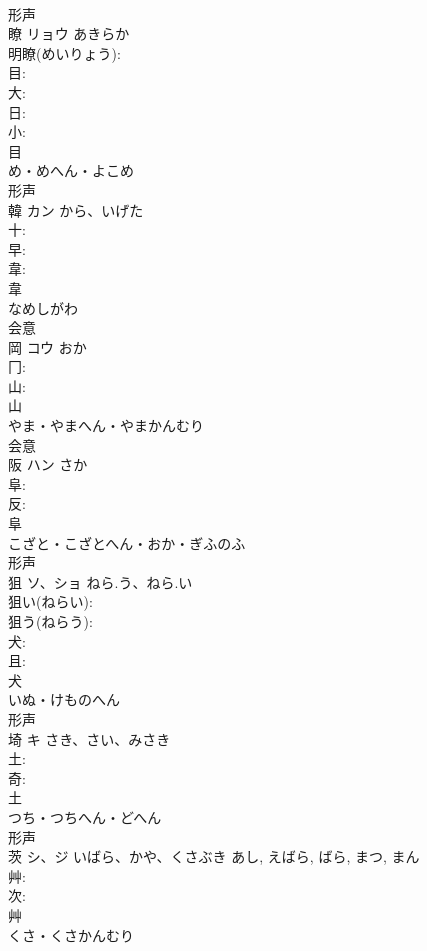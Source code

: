 \documentclass[8pt]{extreport}
\begin{document}
\begin{CJK}{UTF8}{min}
\\	形声 
\\	瞭	リョウ	あきらか		
\\	明瞭(めいりょう): 
\\	目: 
\\	大: 
\\	日: 
\\	小: 
\\	目	
\\	め・めへん・よこめ	
\\	形声 
\\	韓	カン	から、いげた		
\\	十: 
\\	早: 
\\	韋: 
\\	韋	
\\	なめしがわ	
\\	会意 
\\	岡	コウ	おか		
\\	冂: 
\\	山: 
\\	山	
\\	やま・やまへん・やまかんむり	
\\	会意 
\\	阪	ハン	さか		
\\	阜: 
\\	反: 
\\	阜	
\\	こざと・こざとへん・おか・ぎふのふ	
\\	形声 
\\	狙	ソ、ショ	ねら.う、ねら.い		
\\	狙い(ねらい): 
\\	狙う(ねらう): 
\\	犬: 
\\	且: 
\\	犬	
\\	いぬ・けものへん	
\\	形声 
\\	埼	キ	さき、さい、みさき		
\\	土: 
\\	奇: 
\\	土	
\\	つち・つちへん・どへん	
\\	形声 
\\	茨	シ、ジ	いばら、かや、くさぶき	あし, えばら, ばら, まつ, まん	
\\	艸: 
\\	次: 
\\	艸	
\\	くさ・くさかんむり	

\end{CJK}
\end{document}
